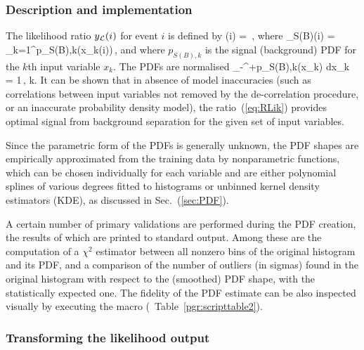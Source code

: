 \subsubsection{Description and implementation}
\label{sec:likelihood:description}

The likelihood ratio $\RLik(i)$ for event $i$ is defined by
\beq
\label{eq:RLik}
	\RLik(i) = \,,
\eeq
where 
\beq
\label{eq:Likelihood}
	\Lik_{S(B)}(i) = \prod_{k=1}^\Nvar p_{S(B),k}(x_k(i))\,,
\eeq
and where $p_{S(B),k}$ is the signal (background) PDF for the $k$th
input variable $x_k$. The PDFs are normalised 
\beq
\label{eq:pdfNorm}
	\intl_{-\infty}^{+\infty}p_{S(B),k}(x_k) dx_k = 1\,, \hspace{0.5cm}\forall k.
\eeq
It can be shown that in absence of model inaccuracies (such as correlations
between input variables not removed by the de-correlation procedure, or an inaccurate
probability density model), the ratio~(\ref{eq:RLik}) provides optimal signal from 
background separation for the given set of input variables. 

Since the parametric form of the PDFs is generally unknown, the PDF shapes are empirically
approximated from the training data by nonparametric functions, which can be 
chosen individually for each variable and are either  polynomial 
splines of various degrees fitted to histograms or unbinned kernel density estimators (KDE),
as discussed in Sec.~(\ref{sec:PDF}). 

A certain number of primary validations are performed during the PDF
creation, the results of which are printed to standard output.
Among these are the computation
of a $\chi^2$ estimator between all nonzero bins of the original 
histogram and its PDF, and a comparison of the number of outliers 
(in sigmas) found in the original histogram with respect to the 
(smoothed) PDF shape, with the statistically expected one. The 
fidelity of the PDF estimate can be also inspected visually by executing 
the macro  (\cf\  Table~\ref{pgr:scripttable2}).

\subsubsection*{Transforming the likelihood output}

